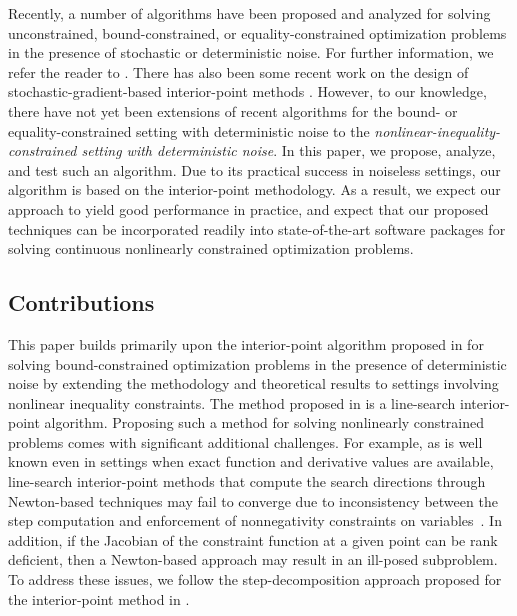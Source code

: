 Recently, a number of algorithms have been proposed and analyzed for solving unconstrained, bound-constrained, or equality-constrained optimization problems in the presence of stochastic or deterministic noise.  For further information, we refer the reader to \cite{berahas2019derivative,berahas2021global,berahas2021sequential,curtis2021inexact,curtis2023sequential,curtis2019stochastic,na2023inequality,oztoprak2023constrained,paquette2020stochastic,qiu2023sequential,sun2023trust,xie2020analysis}.  There has also been some recent work on the design of stochastic-gradient-based interior-point methods \cite{CurtJianWang24,CurtKungRobiWang23}.  However, to our knowledge, there have not yet been extensions of recent algorithms for the bound- or equality-constrained setting with deterministic noise to the \emph{nonlinear-inequality-constrained setting with deterministic noise}.  In this paper, we propose, analyze, and test such an algorithm.  Due to its practical success in noiseless settings, our algorithm is based on the interior-point methodology.  As a result, we expect our approach to yield good performance in practice, and expect that our proposed techniques can be incorporated readily into state-of-the-art software packages for solving continuous nonlinearly constrained optimization problems.

\subsection{Contributions}\label{sec.contributions}

This paper builds primarily upon the interior-point algorithm proposed in \cite{dezfulian2024convergence} for solving bound-constrained optimization problems in the presence of deterministic noise by extending the methodology and theoretical results to settings involving nonlinear inequality constraints.  The method proposed in \cite{dezfulian2024convergence} is a line-search interior-point algorithm.  Proposing such a method for solving nonlinearly constrained problems comes with significant additional challenges.  For example, as is well known even in settings when exact function and derivative values are available, line-search interior-point methods that compute the search directions through Newton-based techniques may fail to converge due to inconsistency between the step computation and enforcement of nonnegativity constraints on variables~\cite{wachter2000failure}.  In addition, if the Jacobian of the constraint function at a given point can be rank deficient, then a Newton-based approach may result in an ill-posed subproblem.  To address these issues, we follow the step-decomposition approach proposed for the interior-point method in \cite{CurtScheWaec10}.


